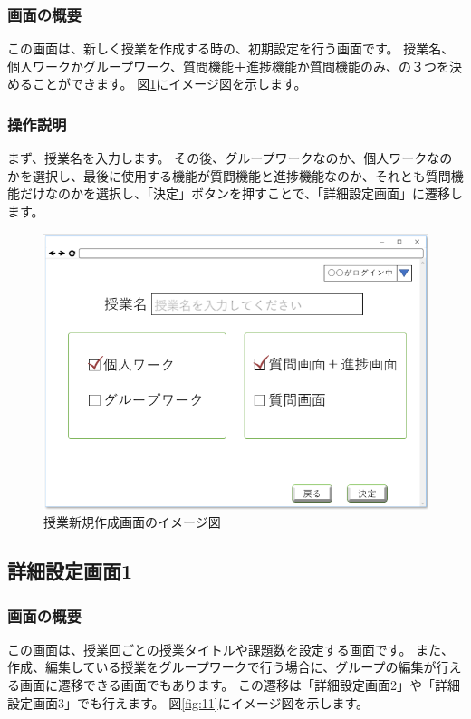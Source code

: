 \subsubsection{画面の概要}
この画面は、新しく授業を作成する時の、初期設定を行う画面です。
授業名、個人ワークかグループワーク、質問機能＋進捗機能か質問機能のみ、の３つを決めることができます。
図\ref{fig:10}にイメージ図を示します。

\subsubsection{操作説明}
まず、授業名を入力します。
その後、グループワークなのか、個人ワークなのかを選択し、最後に使用する機能が質問機能と進捗機能なのか、それとも質問機能だけなのかを選択し、「決定」ボタンを押すことで、「詳細設定画面」に遷移します。

\begin{figure}[htbp]
  \begin{center}
    \includegraphics[width=0.7\linewidth,clip]{./img/10.png}
    \caption{授業新規作成画面のイメージ図}\label{fig:10}
  \end{center}
\end{figure}

\newpage

\subsection{詳細設定画面1}
\subsubsection{画面の概要}
この画面は、授業回ごとの授業タイトルや課題数を設定する画面です。
また、作成、編集している授業をグループワークで行う場合に、グループの編集が行える画面に遷移できる画面でもあります。
この遷移は「詳細設定画面2」や「詳細設定画面3」でも行えます。
図\ref{fig:11}にイメージ図を示します。

